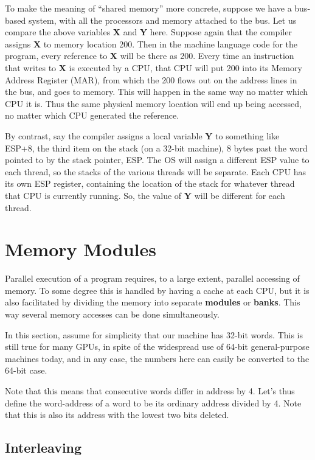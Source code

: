 To make the meaning of ``shared memory'' more concrete, suppose we have
a bus-based system, with all the processors and memory attached to the
bus. Let us compare the above variables {\bf X} and {\bf Y} here.
Suppose again that the compiler assigns {\bf X} to memory location 200.
Then in the machine language code for the program, every reference to
{\bf X} will be there as 200. Every time an instruction that writes to
{\bf X} is executed by a CPU, that CPU will put 200 into its Memory
Address Register (MAR), from which the 200 flows out on the address
lines in the bus, and goes to memory. This will happen in the same way
no matter which CPU it is. Thus the same physical memory location will
end up being accessed, no matter which CPU generated the reference.

By contrast, say the compiler assigns a local variable {\bf Y} to
something like ESP+8, the third item on the stack (on a 32-bit machine),
8 bytes past the word pointed to by the stack pointer, ESP.  The OS will
assign a different ESP value to each thread, so the stacks of the
various threads will be separate.  Each CPU has its own ESP register,
containing the location of the stack for whatever thread that CPU is
currently running.  So, the value of {\bf Y} will be different for each
thread.

\section{Memory Modules}
\label{banks}

Parallel execution of a program requires, to a large extent, parallel
accessing of memory.  To some degree this is handled by having a cache
at each CPU, but it is also facilitated by dividing the memory into
separate {\bf modules} or {\bf banks}.  This way several memory accesses
can be done simultaneously.

In this section, assume for simplicity that our machine has 32-bit
words.  This is still true for many GPUs, in spite of the widespread use
of 64-bit general-purpose machines today, and in any case, the numbers
here can easily be converted to the 64-bit case.  

Note that this means that consecutive words differ in address by 4.
Let's thus define the word-address of a word to be its ordinary address
divided by 4.  Note that this is also its address with the lowest two
bits deleted.

\subsection{Interleaving}
\label{interleaving}

